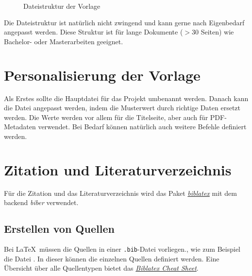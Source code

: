 \begin{figure}[h]
	\caption{Dateistruktur der Vorlage}
	\label{fig:Dateistruktur}
\end{figure}

Die Dateistruktur ist natürlich nicht zwingend und kann gerne nach Eigenbedarf angepasst werden. Diese Struktur ist für lange Dokumente ($>30$ Seiten) wie Bachelor- oder Masterarbeiten geeignet.

\section{Personalisierung der Vorlage}
Als Erstes sollte die Hauptdatei  für das Projekt umbenannt werden. Danach kann die Datei  angepasst werden, indem die Musterwert durch richtige Daten ersetzt werden. Die Werte werden vor allem für die Titelseite, aber auch für PDF-Metadaten verwendet. Bei Bedarf können natürlich auch weitere Befehle definiert werden.

\section{Zitation und Literaturverzeichnis}
Für die Zitation und das Literaturverzeichnis wird das Paket \href{https://ctan.org/pkg/biblatex?lang=de}{\textit{biblatex}} mit dem backend \textit{biber} verwendet.

\subsection{Erstellen von Quellen}
Bei \LaTeX\ müssen die Quellen in einer \verb|.bib|-Datei vorliegen., wie zum Beispiel die Datei . In dieser können die einzelnen Quellen definiert werden. Eine Übersicht über alle Quellentypen bietet das \href{http://tug.ctan.org/info/biblatex-cheatsheet/biblatex-cheatsheet.pdf}{\textit{Biblatex Cheat Sheet}}.

